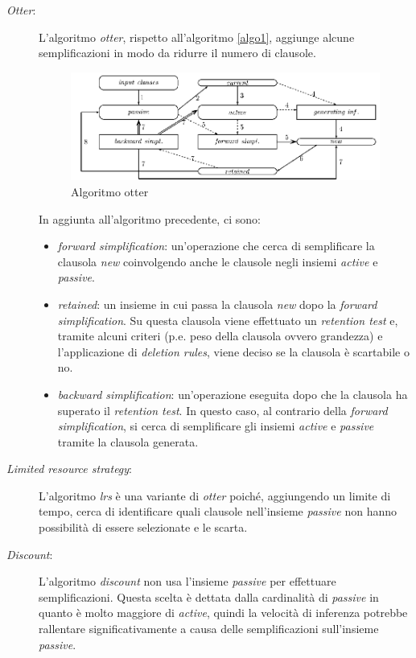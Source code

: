 \begin{description}
    \item[\emph{Otter}:] L'algoritmo \emph{otter}, rispetto all'algoritmo \ref{algo1}, aggiunge alcune semplificazioni in modo da ridurre il numero di clausole.
    \begin{figure}[H]
        \centering
        \includegraphics[width=\columnwidth]{figures/otter.png}
        \caption{Algoritmo otter \cite{riazanov2002design}}
    \end{figure}
    In aggiunta all'algoritmo precedente, ci sono:
    \begin{itemize}
        \item \emph{forward simplification}: un'operazione che cerca di semplificare la clausola \emph{new} coinvolgendo anche 
        le clausole negli insiemi \emph{active} e \emph{passive}.
        \item \emph{retained}: un insieme in cui passa la clausola \emph{new} dopo la \emph{forward simplification}. Su questa clausola viene effettuato un 
        \emph{retention test} e, tramite alcuni criteri (p.e. peso della clausola ovvero grandezza) e l'applicazione di \emph{deletion rules}, viene deciso se la clausola 
        è scartabile o no.
        \item \emph{backward simplification}: un'operazione eseguita dopo che la clausola ha superato il \emph{retention test}. In questo caso, al contrario della \emph{forward simplification}, 
        si cerca di semplificare gli insiemi \emph{active} e \emph{passive} tramite la clausola generata.
    \end{itemize}
    \item[\emph{Limited resource strategy}:] L'algoritmo \emph{lrs} è una variante di \emph{otter} poiché, aggiungendo un limite di tempo,
    cerca di identificare quali clausole nell'insieme \emph{passive} non hanno possibilità di essere selezionate e le scarta.
    \item[\emph{Discount}:] L'algoritmo \emph{discount} non usa l'insieme \emph{passive} per effettuare semplificazioni. Questa scelta è dettata dalla cardinalità di \emph{passive} in quanto è molto maggiore di \emph{active},
    quindi la velocità di inferenza potrebbe rallentare significativamente a causa delle semplificazioni sull'insieme \emph{passive}. 
\end{description}

